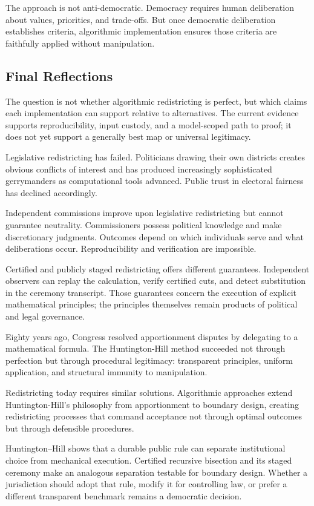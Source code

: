 The approach is not anti-democratic. Democracy requires human deliberation about values, priorities, and trade-offs. But once democratic deliberation establishes criteria, algorithmic implementation ensures those criteria are faithfully applied without manipulation.

\subsection{Final Reflections}

The question is not whether algorithmic redistricting is perfect, but which
claims each implementation can support relative to alternatives. The current
evidence supports reproducibility, input custody, and a model-scoped path to
proof; it does not yet support a generally best map or universal legitimacy.

Legislative redistricting has failed. Politicians drawing their own districts creates obvious conflicts of interest and has produced increasingly sophisticated gerrymanders as computational tools advanced. Public trust in electoral fairness has declined accordingly.

Independent commissions improve upon legislative redistricting but cannot guarantee neutrality. Commissioners possess political knowledge and make discretionary judgments. Outcomes depend on which individuals serve and what deliberations occur. Reproducibility and verification are impossible.

Certified and publicly staged redistricting offers different guarantees.
Independent observers can replay the calculation, verify certified cuts, and
detect substitution in the ceremony transcript. Those guarantees concern the
execution of explicit mathematical principles; the principles themselves
remain products of political and legal governance.

Eighty years ago, Congress resolved apportionment disputes by delegating to a mathematical formula. The Huntington-Hill method succeeded not through perfection but through procedural legitimacy: transparent principles, uniform application, and structural immunity to manipulation.

Redistricting today requires similar solutions. Algorithmic approaches extend Huntington-Hill's philosophy from apportionment to boundary design, creating redistricting processes that command acceptance not through optimal outcomes but through defensible procedures.

Huntington--Hill shows that a durable public rule can separate institutional
choice from mechanical execution. Certified recursive bisection and its staged
ceremony make an analogous separation testable for boundary design. Whether a
jurisdiction should adopt that rule, modify it for controlling law, or prefer a
different transparent benchmark remains a democratic decision.
